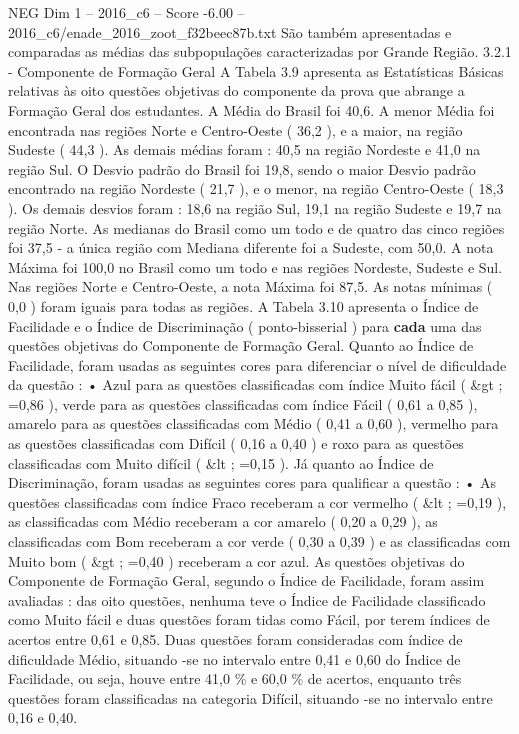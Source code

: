 \begin{textsample}{NEG Dim 1 – 2016\_c6 – Score -6.00 – 2016\_c6/enade\_2016\_zoot\_f32beec87b.txt}
São também apresentadas e comparadas as médias das subpopulações caracterizadas por Grande Região. 3.2.1 - Componente de Formação Geral A Tabela 3.9 apresenta as Estatísticas Básicas relativas às oito questões objetivas do componente da prova que abrange a Formação Geral dos estudantes.
A Média do Brasil foi 40,6.
A menor Média foi encontrada nas regiões Norte e Centro-Oeste ( 36,2 ), e a maior, na região Sudeste ( 44,3 ).
As demais médias foram : 40,5 na região Nordeste e 41,0 na região Sul.
O Desvio padrão do Brasil foi 19,8, sendo o maior Desvio padrão encontrado na região Nordeste ( 21,7 ), e o menor, na região Centro-Oeste ( 18,3 ).
Os demais desvios foram : 18,6 na região Sul, 19,1 na região Sudeste e 19,7 na região Norte.
As medianas do Brasil como um todo e de quatro das cinco regiões foi 37,5 - a única região com Mediana diferente foi a Sudeste, com 50,0.
A nota Máxima foi 100,0 no Brasil como um todo e nas regiões Nordeste, Sudeste e Sul.
Nas regiões Norte e Centro-Oeste, a nota Máxima foi 87,5.
As notas mínimas ( 0,0 ) foram iguais para todas as regiões.
A Tabela 3.10 apresenta o Índice de Facilidade e o Índice de Discriminação ( ponto-bisserial ) para \textbf{cada} uma das questões objetivas do Componente de Formação Geral.
Quanto ao Índice de Facilidade, foram usadas as seguintes cores para diferenciar o nível de dificuldade da questão : • Azul para as questões classificadas com índice Muito fácil ( \&gt ; =0,86 ), verde para as questões classificadas com índice Fácil ( 0,61 a 0,85 ), amarelo para as questões classificadas com Médio ( 0,41 a 0,60 ), vermelho para as questões classificadas com Difícil ( 0,16 a 0,40 ) e roxo para as questões classificadas com Muito difícil ( \&lt ; =0,15 ).
Já quanto ao Índice de Discriminação, foram usadas as seguintes cores para qualificar a questão : • As questões classificadas com índice Fraco receberam a cor vermelho ( \&lt ; =0,19 ), as classificadas com Médio receberam a cor amarelo ( 0,20 a 0,29 ), as classificadas com Bom receberam a cor verde ( 0,30 a 0,39 ) e as classificadas com Muito bom ( \&gt ; =0,40 ) receberam a cor azul.
As questões objetivas do Componente de Formação Geral, segundo o Índice de Facilidade, foram assim avaliadas : das oito questões, nenhuma teve o Índice de Facilidade classificado como Muito fácil e duas questões foram tidas como Fácil, por terem índices de acertos entre 0,61 e 0,85.
Duas questões foram consideradas com índice de dificuldade Médio, situando -se no intervalo entre 0,41 e 0,60 do Índice de Facilidade, ou seja, houve entre 41,0 \% e 60,0 \% de acertos, enquanto três questões foram classificadas na categoria Difícil, situando -se no intervalo entre 0,16 e 0,40.

\end{textsample}
